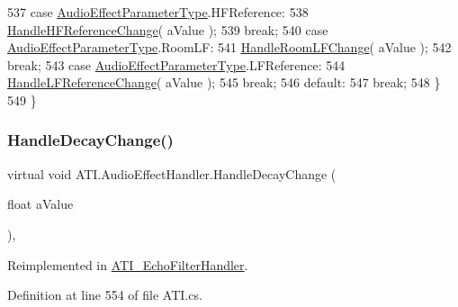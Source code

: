 \begin{DoxyCode}
537                 \textcolor{keywordflow}{case} \hyperlink{class_a_t_i_a1123d61b8dceb5867a3683e8d2224ee1}{AudioEffectParameterType}.HFReference:
538                     \hyperlink{class_a_t_i_1_1_audio_effect_handler_a183b75c93279e0d6322a0e005c590891}{HandleHFReferenceChange}( aValue );
539                     \textcolor{keywordflow}{break};
540                 \textcolor{keywordflow}{case} \hyperlink{class_a_t_i_a1123d61b8dceb5867a3683e8d2224ee1}{AudioEffectParameterType}.RoomLF:
541                     \hyperlink{class_a_t_i_1_1_audio_effect_handler_ae2648d4ab8a617cbc509f7cfc38f21f6}{HandleRoomLFChange}( aValue );
542                     \textcolor{keywordflow}{break};
543                 \textcolor{keywordflow}{case} \hyperlink{class_a_t_i_a1123d61b8dceb5867a3683e8d2224ee1}{AudioEffectParameterType}.LFReference:
544                     \hyperlink{class_a_t_i_1_1_audio_effect_handler_a8414b47429880ba18133571c86cf14ab}{HandleLFReferenceChange}( aValue );
545                     \textcolor{keywordflow}{break};
546                 \textcolor{keywordflow}{default}:
547                     \textcolor{keywordflow}{break};
548             \}
549         \}
\end{DoxyCode}
\mbox{\label{class_a_t_i_1_1_audio_effect_handler_ae8a88211ac0910dc4b7752667abb2f84}} 
\subsubsection{\texorpdfstring{Handle\+Decay\+Change()}{HandleDecayChange()}}
{\footnotesize\ttfamily virtual void A\+T\+I.\+Audio\+Effect\+Handler.\+Handle\+Decay\+Change (\begin{DoxyParamCaption}\item[{float}]{a\+Value }\end{DoxyParamCaption})\hspace{0.3cm}{\ttfamily [protected]}, {\ttfamily [virtual]}}



Reimplemented in \hyperlink{class_a_t_i___echo_filter_handler_a280746246e42f85d36f96640a7148705}{A\+T\+I\+\_\+\+Echo\+Filter\+Handler}.



Definition at line 554 of file A\+T\+I.\+cs.


